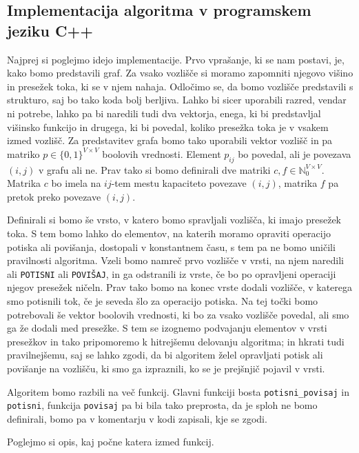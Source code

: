 \documentclass[mat1]{fmfdelo}
\newcommand{\N}{\mathbb N}
\begin{document}
\subsection{Implementacija algoritma v programskem jeziku C++}

Najprej si po\-glej\-mo idejo implementacije. Prvo vprašanje, ki se nam postavi, je, kako bomo predstavili graf. Za vsako vozlišče si moramo zapomniti njegovo višino in presežek toka, ki se v njem nahaja. Odločimo se, da bomo vozlišče predstavili s strukturo, saj bo tako koda bolj berljiva. Lahko bi sicer uporabili razred, vendar ni potrebe, lahko pa bi naredili tudi dva vektorja, enega, ki bi predstavljal višinsko funkcijo in drugega, ki bi povedal, koliko presežka toka je v vsakem izmed vozlišč. Za predstavitev grafa bomo tako uporabili vektor vozlišč in pa matriko $p\in \{0,1\}^{V \times V}$ boolovih vrednosti. Element $p_{ij}$ bo povedal, ali je povezava $(i,j)$ v grafu ali ne. Prav tako si bomo definirali dve matriki $c, f \in \N_0^{V \times V}$. Matrika $c$ bo imela na $ij$-tem mestu kapaciteto povezave $(i,j)$, matrika $f$ pa pretok preko povezave $(i,j)$.

Definirali si bomo še vrsto, v katero bomo spravljali vozlišča, ki imajo presežek toka. S tem bomo lahko do elementov, na katerih moramo opraviti operacijo potiska ali povišanja, dostopali v konstantnem času, s tem pa ne bomo uničili pravilnosti algoritma. Vzeli bomo namreč prvo vozlišče v vrsti, na njem naredili ali \texttt{POTISNI} ali \texttt{POVIŠAJ}, in ga odstranili iz vrste, če bo po opravljeni operaciji njegov presežek ničeln. Prav tako bomo na konec vrste dodali vozlišče, v katerega smo potisnili tok, če je seveda šlo za operacijo potiska. Na tej točki bomo potrebovali še vektor boolovih vrednosti, ki bo za vsako vozlišče povedal, ali smo ga že dodali med presežke. S tem se izognemo podvajanju elementov v vrsti presežkov in tako pripomoremo k hitrejšemu delovanju algoritma; in hkrati tudi pravilnejšemu, saj se lahko zgodi, da bi algoritem želel opravljati potisk ali povišanje na vozlišču, ki smo ga izpraznili, ko se je prejšnjič pojavil v vrsti.

Algoritem bomo razbili na več funkcij. Glavni funkciji bosta \texttt{potisni\_povisaj} in \texttt{potisni}, funkcija \texttt{povisaj} pa bi bila tako preprosta, da je sploh ne bomo definirali, bomo pa v komentarju v kodi zapisali, kje se zgodi.

Poglejmo si opis, kaj počne katera izmed funkcij.
\end{document}
